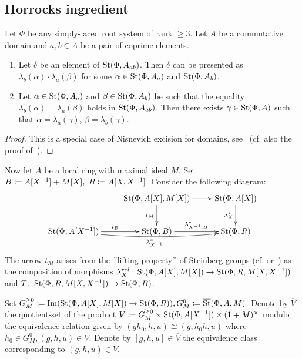 \subsection{Horrocks ingredient}\label{subsec:horrocks-ingredient}
\begin{lemma} \label{lem:zariski-glueing}
Let $\Phi$ be any simply-laced root system of rank $\geq 3$.
Let $A$ be a commutative domain and $a, b \in A$ be a pair of coprime elements.
\begin{enumerate}
    \item Let $\delta$ be an element of $\operatorname{St}(\Phi, A_{ab})$.
    Then $\delta$ can be presented as $\lambda_b(\alpha) \cdot \lambda_a(\beta)$ for some
    $\alpha \in \operatorname{St}(\Phi, A_a)$ and \beta \in $\operatorname{St}(\Phi, A_b)$.
    \item  Let $\alpha \in \operatorname{St}(\Phi, A_a)$ and $\beta \in \operatorname{St}(\Phi, A_b)$ be such that the equality $\lambda_b(\alpha) = \lambda_a(\beta)$ holds in $\operatorname{St}(\Phi, A_{ab})$.
    Then there exists $\gamma \in \operatorname{St}(\Phi, A)$ such that $\alpha = \lambda_a(\gamma)$, $\beta = \lambda_b(\gamma)$.
\end{enumerate}

\end{lemma}
\begin{proof}
    This is a special case of Nisnevich excision for domains, see~\cite[Proposition~4.5]{LSV2}
    (cf. also the proof of~\cite[Lemma~2.6]{LSV2}).
\end{proof}

Now let $A$ be a local ring with maximal ideal $M$.
Set $B \coloneqq A[X^{-1}] + M[X],\ R \coloneqq A[X, X^{-1}]$.
Consider the following diagram:
\[ \xymatrix{ & \St(\Phi, A[X], M[X]) \ar[d]_{t_M} \ar[r] & \St(\Phi, A[X]) \ar[d]_{\lambda_X^*} \\
   \St(\Phi, A[X\inv]) \ar[r]^{i_B} \ar@/_/[rr]_{\lambda_{X\inv}^*} & \St(\Phi, B) \ar[r]^{\lambda^*_{X\inv, B}} & \St(\Phi, R)
}\]
The arrow $t_M$ arises from the \("\)lifting property\("\) of Steinberg groups (cf. \cite[Lemma~3.3]{LS20} or~\cite[Theorem~3]{LS17}) as the composition of morphisms
$\lambda_{X}^{rel}\colon \operatorname{St}(\Phi, A[X], M[X]) \to \operatorname{St}(\Phi, R, M[X, X^{-1}])$ and $T \colon \operatorname{St}(\Phi, R, M[X, X^{-1}]) \to \operatorname{St}(\Phi, B)$.

Set $G_M^{\geq 0} \coloneqq \operatorname{Im}(\operatorname{St}(\Phi, A[X], M[X]) \to \operatorname{St}(\Phi, R)), G_M^0 \coloneqq \overline{\operatorname{St}}(\Phi, A, M)$.%
Denote by $\overline{V}$ the quotient-set of the product $V \coloneqq G_M^{\geq 0} \times \operatorname{St}(\Phi, A[X^{-1}]) \times (1 + M)^\times$
 modulo the equivalence relation given by $(gh_0, h, u) \cong (g, h_0h, u)$ where $h_0 \in G_M^0, (g, h, u) \in V.$
Denote by $[g, h, u] \in \overline{V}$ the equivalence class corresponding to $(g, h, u)\in V$.

